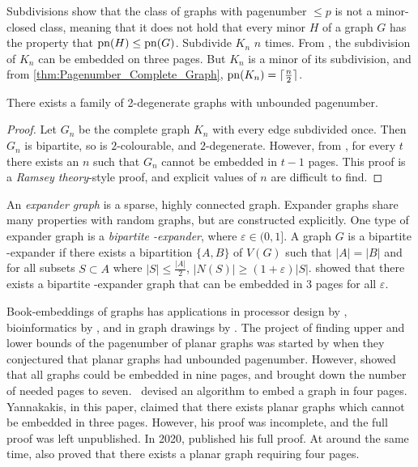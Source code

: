 Subdivisions show that the class of graphs with pagenumber $\leq p$ is not a minor-closed class, meaning that it does not hold that every minor $H$ of a graph $G$ has the property that $\operatorname{pn}(H) \leq \operatorname{pn}(G)$. 
Subdivide $K_n$ $n$ times. From \textcite{atneosenEmbeddabilityCompactaNbooks}, the subdivision of $K_n$ can be embedded on three pages. But $K_n$ is a minor of its subdivision, and from \cref{thm:Pagenumber_Complete_Graph}, $\operatorname{pn}(K_n) = \lceil \frac{n}{2} \rceil$. 


\begin{theorem}
	There exists a family of 2-degenerate graphs with unbounded pagenumber.
\end{theorem}
\begin{proof}
	Let $G_n$ be the complete graph $K_n$ with every edge subdivided once. Then $G_n$ is bipartite, so is $2$-colourable, and $2$-degenerate. However, from \textcite{eppsteinSeparatingThicknessGeometric2002}, for every $t$ there exists an $n$ such that $G_n$ cannot be embedded in $t-1$ pages. This proof is a \textit{Ramsey theory}-style proof, and explicit values of $n$ are difficult to find. 
\end{proof}

An \textit{expander graph} is a sparse, highly connected graph. Expander graphs share many properties with random graphs, but are constructed explicitly. One type of expander graph is a \textit{bipartite \varepsilon-expander}, where $\varepsilon \in (0, 1]$. A graph $G$ is a bipartite \varepsilon-expander if there exists a bipartition $ \{A, B\}$ of $V(G)$ such that $|A| = |B|$ and for all subsets $S \subset A$ where $|S| \leq \frac{|A|}{2}$, $|N(S)| \geq (1 + \varepsilon) |S|$. 
\textcite{dujmovicLayoutsExpanderGraphs2016} showed that there exists a bipartite \varepsilon-expander graph that can be embedded in 3 pages for all $\varepsilon$. 


Book-embeddings of graphs has applications in processor design by \textcite{chungEmbeddingGraphsBooks1987}, bioinformatics by \textcite{haslingerRNAStructuresPseudoknots1999}, and in graph drawings by \textcite{woodBoundedDegreeBook2002}. 
The project of finding upper and lower bounds of the pagenumber of planar graphs was started by \textcite{bernhartBookThicknessGraph1979} when they conjectured that planar graphs had unbounded pagenumber. However, \textcite{bussPagenumberPlanarGraphs1984} showed that all graphs could be embedded in nine pages, and \textcite{heathEmbeddingPlanarGraphs1984} brought down the number of needed pages to seven.\ \textcite{yannakakisEmbeddingPlanarGraphs1989} devised an algorithm to embed a graph in four pages. Yannakakis, in this paper, claimed that there exists planar graphs which cannot be embedded in three pages. However, his proof was incomplete, and the full proof was left unpublished. In 2020, \textcite{yannakakisPlanarGraphsThat2020} published his full proof. At around the same time, \textcite{kaufmannFourPagesAre2020} also proved that there exists a planar graph requiring four pages.

